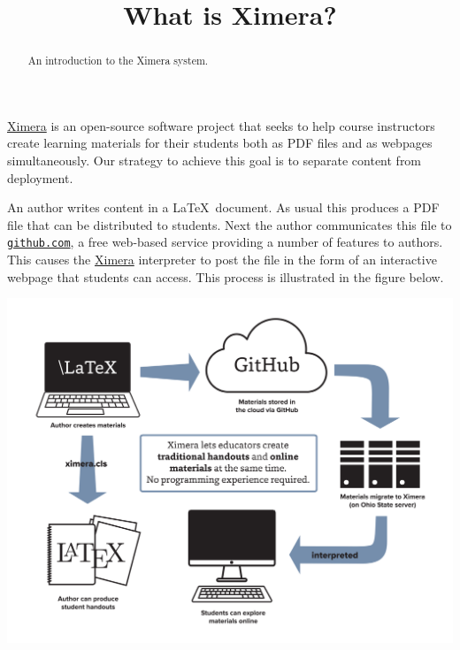 \documentclass{ximera}
\title{What is Ximera?}
\begin{document}
\begin{abstract}
An introduction to the Ximera system.
\end{abstract}
\maketitle

\href{http://ximera.osu.edu}{\sf Ximera}
is an open-source software project that
seeks to help course instructors create learning materials
for their students both as PDF files and as webpages
simultaneously. Our strategy to achieve this goal is to separate
content from deployment.

An author writes content in a \LaTeX\ document.
As usual this produces a PDF file that can be distributed to students.
Next the author communicates this file to
\href{http://github.com}{\tt github.com},
a free web-based service providing a number of features to authors.
This causes the
\href{http://ximera.osu.edu}{\sf Ximera}
interpreter to post the file in the form of an interactive webpage
that students can access.
This process is illustrated in the figure below.

\begin{image}
\includegraphics[scale=.5]{XimeraGraphic.png}
\end{image}
\end{document}
